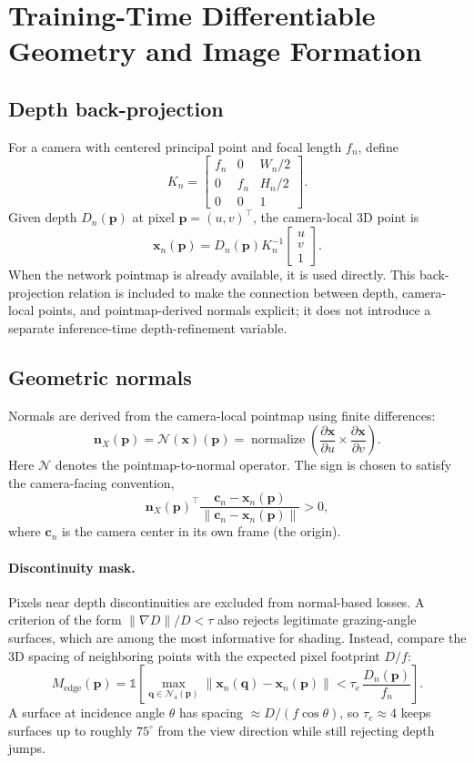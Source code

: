 \documentclass[11pt,a4paper]{article}
\newcommand{\normalize}{\operatorname{normalize}}
\begin{document}
\section{Training-Time Differentiable Geometry and Image Formation}

\subsection{Depth back-projection}

For a camera with centered principal point and focal length $f_n$, define
\[
  K_n =
  \begin{bmatrix}
    f_n & 0 & W_n/2\\
    0 & f_n & H_n/2\\
    0 & 0 & 1
  \end{bmatrix}.
\]
Given depth $D_n(\bm p)$ at pixel
$\bm p=(u,v)^\top$, the camera-local 3D point is
\[
  \bm x_n(\bm p)
  =
  D_n(\bm p)
  K_n^{-1}
  \begin{bmatrix}u\\v\\1\end{bmatrix}.
\]
When the network pointmap is already available, it is used directly. This
back-projection relation is included to make the connection between depth,
camera-local points, and pointmap-derived normals explicit; it does not
introduce a separate inference-time depth-refinement variable.

\subsection{Geometric normals}

Normals are derived from the camera-local pointmap using finite
differences:
\[
  \bm n_X(\bm p)
  =
  \mathcal N(\bm x)(\bm p)
  =
  \normalize
  \left(
    \frac{\partial\bm x}{\partial u}
    \times
    \frac{\partial\bm x}{\partial v}
  \right).
\]
Here $\mathcal N$ denotes the pointmap-to-normal operator. The sign is chosen to satisfy the camera-facing convention,
\[
  \bm n_X(\bm p)^\top
  \frac{\bm c_n-\bm x_n(\bm p)}
       {\|\bm c_n-\bm x_n(\bm p)\|}
  >0,
\]
where $\bm c_n$ is the camera center in its own frame (the origin).

\paragraph{Discontinuity mask.}
Pixels near depth discontinuities are excluded from normal-based losses. A
criterion of the form $\|\nabla D\|/D<\tau$ also rejects legitimate
grazing-angle surfaces, which are among the most informative for shading.
Instead, compare the 3D spacing of neighboring points with the expected
pixel footprint $D/f$:
\[
  M_{\mathrm{edge}}(\bm p)
  =
  \mathbb{1}
  \left[
    \max_{\bm q\in\mathcal N_4(\bm p)}
    \left\|\bm x_n(\bm q)-\bm x_n(\bm p)\right\|
    <
    \tau_e\,\frac{D_n(\bm p)}{f_n}
  \right].
\]
A surface at incidence angle $\theta$ has spacing $\approx D/(f\cos\theta)$,
so $\tau_e\approx4$ keeps surfaces up to roughly $75^\circ$ from the
view direction while still rejecting depth jumps.
\end{document}
